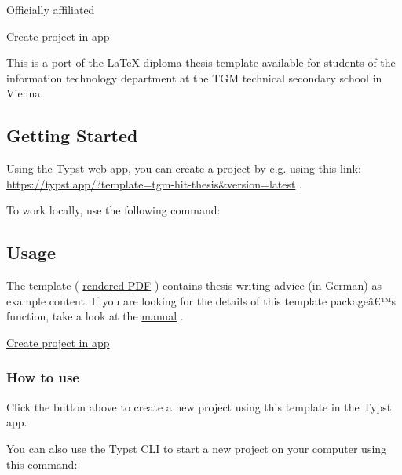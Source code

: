 { } Officially affiliated

\href{/app?template=tgm-hit-thesis&version=0.2.0}{Create project in app}

\label{readme}
This is a port of the
\href{https://github.com/TGM-HIT/diploma-thesis}{LaTeX diploma thesis
template} available for students of the information technology
department at the TGM technical secondary school in Vienna.

\subsection{Getting Started}\label{getting-started}

Using the Typst web app, you can create a project by e.g. using this
link: \url{https://typst.app/?template=tgm-hit-thesis&version=latest} .

To work locally, use the following command:

\begin{Shaded}
\begin{Highlighting}[]
\end{Highlighting}
\end{Shaded}

\subsection{Usage}\label{usage}

The template (
\href{https://github.com/typst/packages/raw/main/packages/preview/tgm-hit-thesis/0.2.0/example.pdf}{rendered
PDF} ) contains thesis writing advice (in German) as example content. If
you are looking for the details of this template packageâ€™s function,
take a look at the
\href{https://github.com/typst/packages/raw/main/packages/preview/tgm-hit-thesis/0.2.0/docs/manual.pdf}{manual}
.

\href{/app?template=tgm-hit-thesis&version=0.2.0}{Create project in app}

\subsubsection{How to use}\label{how-to-use}

Click the button above to create a new project using this template in
the Typst app.

You can also use the Typst CLI to start a new project on your computer
using this command:

